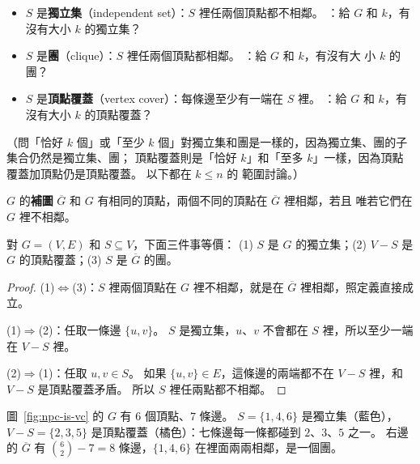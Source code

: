 \begin{itemize}
\item $S$ 是\textbf{獨立集}（independent set）：$S$ 裡任兩個頂點都不相鄰。 ：給 $G$ 和
$k$，有沒有大小 $k$ 的獨立集？
\item $S$ 是\textbf{團}（clique）：$S$ 裡任兩個頂點都相鄰。 ：給 $G$ 和 $k$，有沒有大
小 $k$ 的團？
\item $S$ 是\textbf{頂點覆蓋}（vertex cover）：每條邊至少有一端在 $S$ 裡。 ：給
$G$ 和 $k$，有沒有大小 $k$ 的頂點覆蓋？
\end{itemize}

（問「恰好 $k$ 個」或「至少 $k$ 個」對獨立集和團是一樣的，因為獨立集、團的子集合仍然是獨立集、團；
頂點覆蓋則是「恰好 $k$」和「至多 $k$」一樣，因為頂點覆蓋加頂點仍是頂點覆蓋。 以下都在 $k \le n$ 的
範圍討論。）

$G$ 的\textbf{補圖} $\overline{G}$ 和 $G$ 有相同的頂點，兩個不同的頂點在 $\overline{G}$ 裡相鄰，若且
唯若它們在 $G$ 裡不相鄰。

\begin{lemma}
\label{lem:npc-complement}
對 $G = (V, E)$ 和 $S \subseteq V$，下面三件事等價：
(1) $S$ 是 $G$ 的獨立集；(2) $V - S$ 是 $G$ 的頂點覆蓋；(3) $S$ 是 $\overline{G}$ 的團。
\end{lemma}

\begin{proof}
(1)$\iff$(3)：$S$ 裡兩個頂點在 $G$ 裡不相鄰，就是在 $\overline{G}$ 裡相鄰，照定義直接成立。

(1)$\Rightarrow$(2)：任取一條邊 $\{u, v\}$。 $S$ 是獨立集，$u$、$v$ 不會都在 $S$ 裡，所以至少一端
在 $V - S$ 裡。

(2)$\Rightarrow$(1)：任取 $u, v \in S$。 如果 $\{u, v\} \in E$，這條邊的兩端都不在 $V - S$ 裡，和
$V - S$ 是頂點覆蓋矛盾。 所以 $S$ 裡任兩點都不相鄰。
\end{proof}

圖~\ref{fig:npc-is-vc} 的 $G$ 有 $6$ 個頂點、$7$ 條邊。 $S = \{1, 4, 6\}$ 是獨立集（藍色），
$V - S = \{2, 3, 5\}$ 是頂點覆蓋（橘色）：七條邊每一條都碰到 $2$、$3$、$5$ 之一。 右邊的
$\overline{G}$ 有 $\binom{6}{2} - 7 = 8$ 條邊，$\{1, 4, 6\}$ 在裡面兩兩相鄰，是一個團。

